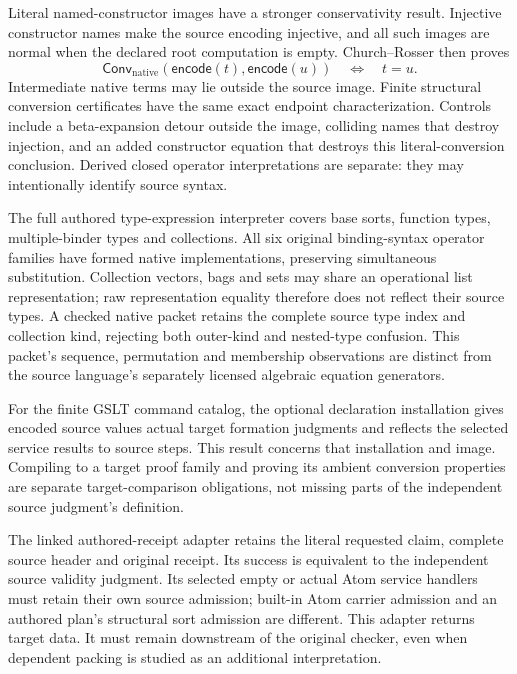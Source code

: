 \documentclass[11pt]{article}
\begin{document}
Literal named-constructor images have a stronger conservativity result.
Injective constructor names make the source encoding injective, and all such
images are normal when the declared root computation is empty. Church--Rosser
then proves
\[
 \mathsf{Conv}_{\mathrm{native}}(\mathsf{encode}(t),\mathsf{encode}(u))
 \quad\Longleftrightarrow\quad t=u.
\]
Intermediate native terms may lie outside the source image. Finite structural
conversion certificates have the same exact endpoint characterization.
Controls include a beta-expansion detour outside the image, colliding names
that destroy injection, and an added constructor equation that destroys this
literal-conversion conclusion. Derived closed operator interpretations are
separate: they may intentionally identify source syntax.

The full authored type-expression interpreter covers base sorts, function
types, multiple-binder types and collections. All six original binding-syntax
operator families have formed native implementations, preserving simultaneous
substitution. Collection vectors, bags and sets may share an operational list
representation; raw representation equality therefore does not reflect their
source types. A checked native packet retains the complete source type index
and collection kind, rejecting both outer-kind and nested-type confusion.
This packet's sequence, permutation and membership observations are distinct
from the source language's separately licensed algebraic equation generators.

For the finite GSLT command catalog, the optional declaration installation
gives encoded source values actual target formation judgments and reflects
the selected service results to source steps. This result concerns that
installation and image. Compiling to a target proof family and proving its
ambient conversion properties are separate target-comparison obligations,
not missing parts of the independent source judgment's definition.

The linked authored-receipt adapter retains the literal requested claim,
complete source header and original receipt. Its success is equivalent to
the independent source validity judgment. Its selected empty or actual Atom
service handlers must retain their own source admission; built-in Atom carrier
admission and an authored plan's structural sort admission are different.
This adapter returns target data. It must remain downstream of the original
checker, even when dependent packing is studied as an additional interpretation.
\end{document}

